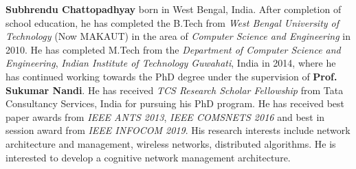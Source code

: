 \large{\textbf{Subhrendu Chattopadhyay} born in West Bengal, India. After completion of school education, he has completed the B.Tech from \emph{West Bengal University of Technology} (Now MAKAUT) in the area of
 \emph{Computer Science and Engineering} in 2010. He has completed M.Tech from the \emph{Department of Computer Science and Engineering}, \emph{Indian Institute of Technology Guwahati}, India in 2014, where he has continued working towards the PhD degree under the supervision of \textbf{Prof. Sukumar Nandi}. He has received \emph{TCS Research Scholar Fellowship} from Tata Consultancy Services, India for pursuing his PhD program. He has received best paper awards from \emph{IEEE ANTS 2013}, \emph{IEEE COMSNETS 2016} and best in session award from \emph{IEEE INFOCOM 2019}. His research interests include network architecture and management, wireless networks, distributed algorithms. He is interested to develop a cognitive network management architecture.}

